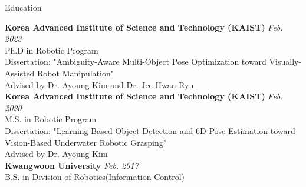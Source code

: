 \begin{rSection}{Education}

{\bf Korea Advanced Institute of Science and Technology (KAIST)} \hfill {\em Feb. 2023} \\
Ph.D in Robotic Program \\
Dissertation: "Ambiguity-Aware Multi-Object Pose Optimization toward Visually-Assisted Robot Manipulation" \\
Advised by Dr. Ayoung Kim and Dr. Jee-Hwan Ryu \\
    

{\bf Korea Advanced Institute of Science and Technology (KAIST)} \hfill {\em Feb. 2020} \\
M.S. in Robotic Program \\
Dissertation: "Learning-Based Object Detection and 6D Pose Estimation toward Vision-Based Underwater Robotic Grasping" \\
Advised by Dr. Ayoung Kim \\

{\bf Kwangwoon University} \hfill {\em Feb. 2017} \\
B.S. in Division of Robotics(Information Control) \\



\vspace{-5mm}

\end{rSection}

